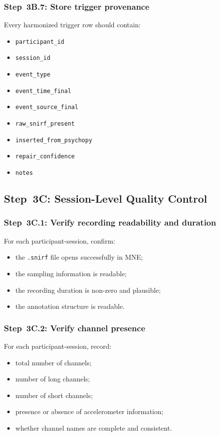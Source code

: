 \subsubsection{Step~3B.7: Store trigger provenance}
Every harmonized trigger row should contain:
\begin{itemize}
    \item \texttt{participant\_id}
    \item \texttt{session\_id}
    \item \texttt{event\_type}
    \item \texttt{event\_time\_final}
    \item \texttt{event\_source\_final}
    \item \texttt{raw\_snirf\_present}
    \item \texttt{inserted\_from\_psychopy}
    \item \texttt{repair\_confidence}
    \item \texttt{notes}
\end{itemize}

\subsection{Step~3C: Session-Level Quality Control}

\subsubsection{Step~3C.1: Verify recording readability and duration}
For each participant-session, confirm:
\begin{itemize}
    \item the \texttt{.snirf} file opens successfully in MNE;
    \item the sampling information is readable;
    \item the recording duration is non-zero and plausible;
    \item the annotation structure is readable.
\end{itemize}

\subsubsection{Step~3C.2: Verify channel presence}
For each participant-session, record:
\begin{itemize}
    \item total number of channels;
    \item number of long channels;
    \item number of short channels;
    \item presence or absence of accelerometer information;
    \item whether channel names are complete and consistent.
\end{itemize}

